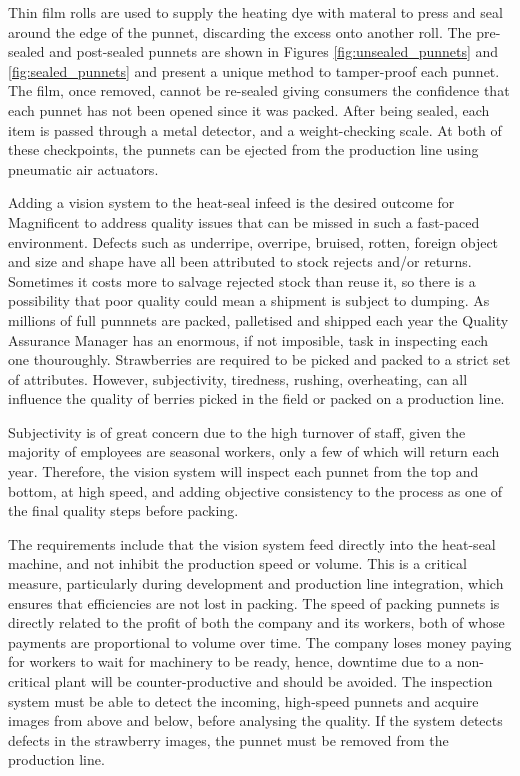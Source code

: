 \documentclass[fleqn,twoside]{article}
\begin{document}
Thin film rolls are used to supply the heating dye with materal to press and seal around the edge of the punnet, discarding the excess onto another roll. The pre-sealed and post-sealed punnets are shown in Figures \ref{fig:unsealed_punnets} and \ref{fig:sealed_punnets} and present a unique method to tamper-proof each punnet. The film, once removed, cannot be re-sealed giving consumers the confidence that each punnet has not been opened since it was packed. After being sealed, each item is passed through a metal detector, and a weight-checking scale. At both of these checkpoints, the punnets can be ejected from the production line using pneumatic air actuators.

Adding a vision system to the heat-seal infeed is the desired outcome for Magnificent to address quality issues that can be missed in such a fast-paced environment. Defects such as underripe, overripe, bruised, rotten, foreign object and size and shape have all been attributed to stock rejects and/or returns. Sometimes it costs more to salvage rejected stock than reuse it, so there is a possibility that poor quality could mean a shipment is subject to dumping. As millions of full punnnets are packed, palletised and shipped each year the Quality Assurance Manager has an enormous, if not imposible, task in inspecting each one thouroughly. Strawberries are required to be picked and packed to a strict set of attributes. However, subjectivity, tiredness, rushing, overheating, can all influence the quality of berries picked in the field or packed on a production line. 

Subjectivity is of great concern due to the high turnover of staff, given the majority of employees are seasonal workers, only a few of which will return each year. Therefore, the vision system will inspect each punnet from the top and bottom, at high speed, and adding objective consistency to the process as one of the final quality steps before packing.

The requirements include that the vision system feed directly into the heat-seal machine, and not inhibit the production speed or volume. This is a critical measure, particularly during development and production line integration, which ensures that efficiencies are not lost in packing. The speed of packing punnets is directly related to the profit of both the company and its workers, both of whose payments are proportional to volume over time. The company loses money paying for workers to wait for machinery to be ready, hence, downtime due to a non-critical plant will be counter-productive and should be avoided. The inspection system must be able to detect the incoming, high-speed punnets and acquire images from above and below, before analysing the quality. If the system detects defects in the strawberry images, the punnet must be removed from the production line. 
\end{document}
